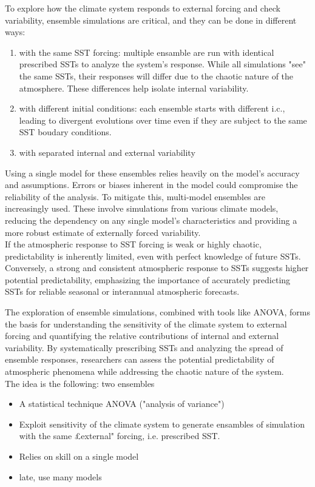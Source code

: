 To explore how the climate system responds to external forcing and check variability, ensemble simulations are critical, and they can be done in different ways:
\begin{enumerate}
	\item with the same SST forcing: multiple ensamble are run with identical prescribed SSTs to analyze the system's response. While all simulations "see" the same SSTs, their responses will differ due to the chaotic nature of the atmosphere. These differences help isolate internal variability.
	\item with different initial conditions: each ensemble starts with different i.c., leading to divergent evolutions over time even if they are subject to the same SST boudary conditions.
	\item with separated internal and external variability
\end{enumerate}
Using a single model for these ensembles relies heavily on the model's accuracy and assumptions. Errors or biases inherent in the model could compromise the reliability of the analysis.
To mitigate this, multi-model ensembles are increasingly used. These involve simulations from various climate models, reducing the dependency on any single model's characteristics and providing a more robust estimate of externally forced variability. \\

If the atmospheric response to SST forcing is weak or highly chaotic, predictability is inherently limited, even with perfect knowledge of future SSTs.
Conversely, a strong and consistent atmospheric response to SSTs suggests higher potential predictability, emphasizing the importance of accurately predicting SSTs for reliable seasonal or interannual atmospheric forecasts.

The exploration of ensemble simulations, combined with tools like ANOVA, forms the basis for understanding the sensitivity of the climate system to external forcing and quantifying the relative contributions of internal and external variability. By systematically prescribing SSTs and analyzing the spread of ensemble responses, researchers can assess the potential predictability of atmospheric phenomena while addressing the chaotic nature of the system.\\






The idea is the following: two ensembles
\begin{itemize}
	\item A statistical technique ANOVA ("analysis of variance")
	\item Exploit sensitivity of the climate system to generate ensambles of simulation with the same £external" forcing, i.e. prescribed SST.
	\item Relies on skill on a single model
	\item late, use many models
\end{itemize}


